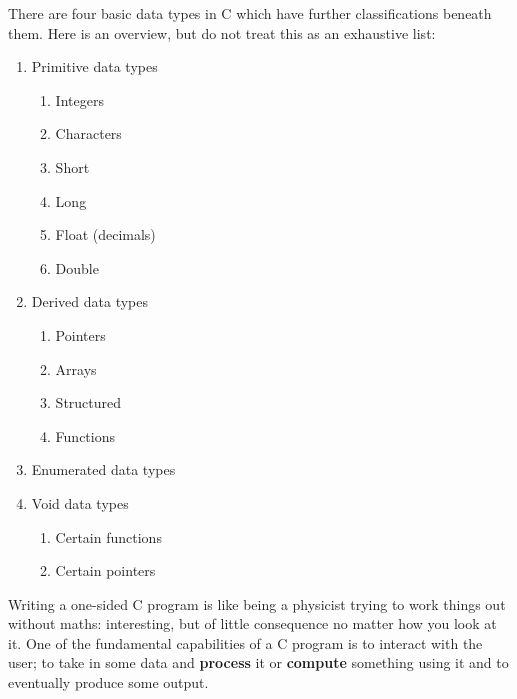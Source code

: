 \documentclass[11pt,oneside]{article}
\begin{document}
There are four basic data types in C which have further classifications beneath them. Here is an overview, but do not treat this as an exhaustive list:
\begin{multicols}{3}
\begin{enumerate}
\item Primitive data types
\begin{enumerate}
\item Integers
\item Characters
\item Short
\item Long
\item Float (decimals)
\item Double
\end{enumerate}
\vfill\null
\columnbreak

\item Derived data types
\begin{enumerate}
\item Pointers
\item Arrays
\item Structured
\item Functions
\end{enumerate}
\vfill\null
\columnbreak

\item Enumerated data types
\item Void data types
\begin{enumerate}
\item Certain functions
\item Certain pointers
\end{enumerate}
\end{enumerate}
\end{multicols}%
Writing a one-sided C program is like being a physicist trying to work things out without maths: interesting, but of little consequence no matter how you look at it. One of the fundamental capabilities of a C program is to interact with the user; to take in some data and \textbf{process} it or \textbf{compute} something using it and to eventually produce some output.
\end{document}
